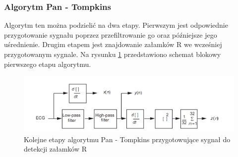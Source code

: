 \subsubsection{Algorytm Pan - Tompkins}

Algorytm ten można podzielić na dwa etapy. Pierwszym jest odpowiednie przygotowanie sygnału poprzez przefiltrowanie go oraz późniejsze jego uśrednienie. Drugim etapem jest znajdowanie załamków R we wcześniej przygotowanym sygnale. Na rysunku \ref{fig:RPPTA} przedstawiono schemat blokowy pierwszego etapu algorytmu.
\begin{figure}[H]
\centering
\includegraphics[scale=0.4]{R_PEAKS/img/pan_tompkins_alg}
\caption{Kolejne etapy algorytmu Pan - Tompkins przygotowujące sygnał do detekcji załamków R}
\label{fig:RPPTA}
\end{figure}
